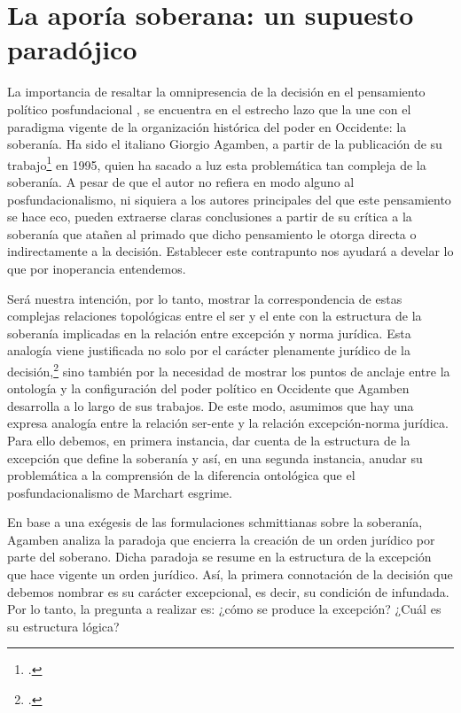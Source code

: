 \section{La aporía soberana: un supuesto paradójico} %

La importancia de resaltar la omnipresencia de la decisión en el pensamiento político posfundacional , se encuentra en el estrecho lazo que la une con el paradigma vigente de la organización histórica del poder en Occidente: la soberanía. Ha sido el italiano Giorgio Agamben, a partir de la publicación de su trabajo\footcite{@7101-AGAMBEN2003} en 1995, quien ha sacado a luz esta problemática tan compleja de la soberanía. A pesar de que el autor no refiera en modo alguno al posfundacionalismo, ni siquiera a los autores principales del que este pensamiento se hace eco, pueden extraerse claras conclusiones a partir de su crítica a la soberanía que atañen al primado que dicho pensamiento le otorga directa o indirectamente a la decisión. Establecer este contrapunto nos ayudará a develar lo que por inoperancia entendemos.

Será nuestra intención, por lo tanto, mostrar la correspondencia de estas complejas relaciones topológicas entre el ser y el ente con la estructura de la soberanía implicadas en la relación entre excepción y norma jurídica. Esta analogía viene justificada no solo por el carácter plenamente jurídico de la decisión,\footcite[32]{@7101-AGAMBEN2003} sino también por la necesidad de mostrar los puntos de anclaje entre la ontología y la configuración del poder político en Occidente que Agamben desarrolla a lo largo de sus trabajos. De este modo, asumimos que hay una expresa analogía entre la relación ser-ente y la relación excepción-norma jurídica. Para ello debemos, en primera instancia, dar cuenta de la estructura de la excepción que define la soberanía y así, en una segunda instancia, anudar su problemática a la comprensión de la diferencia ontológica que el posfundacionalismo de Marchart esgrime.

En base a una exégesis de las formulaciones schmittianas sobre la soberanía, Agamben analiza la paradoja que encierra la creación de un orden jurídico por parte del soberano. Dicha paradoja se resume en la estructura de la excepción que hace vigente un orden jurídico. Así, la primera connotación de la decisión que debemos nombrar es su carácter excepcional, es decir, su condición de infundada. Por lo tanto, la pregunta a realizar es: ¿cómo se produce la excepción? ¿Cuál es su estructura lógica?

